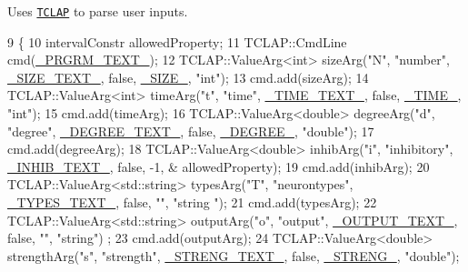 Uses \href{http://tclap.sourceforge.net/html/index.html}{\tt T\+C\+L\+AP} to parse user inputs. 
\begin{DoxyCode}
9                                             \{
10     intervalConstr allowedProperty;
11     TCLAP::CmdLine cmd(\hyperlink{globals_8h_a956c975dbd329dd2c44bf0707ec87928}{\_PRGRM\_TEXT\_});
12     TCLAP::ValueArg<int> sizeArg(\textcolor{stringliteral}{"N"}, \textcolor{stringliteral}{"number"}, \hyperlink{globals_8h_ad6ed0803f0ba1dad283a5f8d223d0771}{\_SIZE\_TEXT\_}, \textcolor{keyword}{false}, 
      \hyperlink{globals_8h_a9acff32baef7c1401d1e2166b0d999c2}{\_SIZE\_}, \textcolor{stringliteral}{"int"});
13     cmd.add(sizeArg);
14     TCLAP::ValueArg<int> timeArg(\textcolor{stringliteral}{"t"}, \textcolor{stringliteral}{"time"}, \hyperlink{globals_8h_a7fb73d75d8e6fe521bc287693f96dea2}{\_TIME\_TEXT\_},  \textcolor{keyword}{false}, 
      \hyperlink{globals_8h_afd5f7c089a6bddd276552473544f977b}{\_TIME\_}, \textcolor{stringliteral}{"int"});
15     cmd.add(timeArg);
16     TCLAP::ValueArg<double> degreeArg(\textcolor{stringliteral}{"d"}, \textcolor{stringliteral}{"degree"}, \hyperlink{globals_8h_a974f4a347352636e3eff38fc6ed15f4e}{\_DEGREE\_TEXT\_},  \textcolor{keyword}{false}, 
      \hyperlink{globals_8h_a3c5c899006fad97c90bca66b048c0d70}{\_DEGREE\_}, \textcolor{stringliteral}{"double"});
17     cmd.add(degreeArg);
18     TCLAP::ValueArg<double> inhibArg(\textcolor{stringliteral}{"i"}, \textcolor{stringliteral}{"inhibitory"}, \hyperlink{globals_8h_a6bb927b9932f49394eb6d0195160f6f8}{\_INHIB\_TEXT\_},  \textcolor{keyword}{false}, -1, &
      allowedProperty);
19     cmd.add(inhibArg);
20     TCLAP::ValueArg<std::string> typesArg(\textcolor{stringliteral}{"T"}, \textcolor{stringliteral}{"neurontypes"}, \hyperlink{globals_8h_a4ff03ef95ba5d9b77316765cba4510a9}{\_TYPES\_TEXT\_},  \textcolor{keyword}{false}, \textcolor{stringliteral}{""}, \textcolor{stringliteral}{"string
      "});
21     cmd.add(typesArg);
22     TCLAP::ValueArg<std::string> outputArg(\textcolor{stringliteral}{"o"}, \textcolor{stringliteral}{"output"}, \hyperlink{globals_8h_ab48fc9989ecb631747042d17b5cb0057}{\_OUTPUT\_TEXT\_},  \textcolor{keyword}{false}, \textcolor{stringliteral}{""}, \textcolor{stringliteral}{"string"})
      ;
23     cmd.add(outputArg);
24     TCLAP::ValueArg<double> strengthArg(\textcolor{stringliteral}{"s"}, \textcolor{stringliteral}{"strength"}, \hyperlink{globals_8h_a5794ab1a7f457a36aa21f5313bf6d4d9}{\_STRENG\_TEXT\_},  \textcolor{keyword}{false}, 
      \hyperlink{globals_8h_ab582a09d695a9c431d8a1c7a0542c086}{\_STRENG\_}, \textcolor{stringliteral}{"double"});

\end{DoxyCode}
